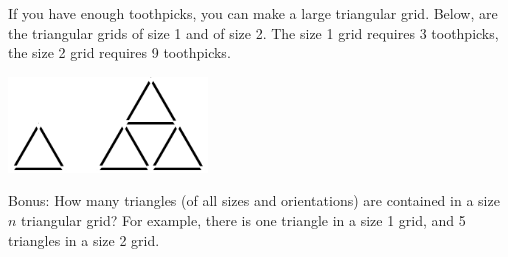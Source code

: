 \documentclass[11pt]{exam}
\begin{document}
\begin{questions}

\question[6] If you have enough toothpicks, you can make a large triangular grid.  Below, are the triangular grids of size 1 and of size 2.  The size 1 grid requires 3 toothpicks, the size 2 grid requires 9 toothpicks.

\centerline{\includegraphics[height=1in]{triangles.png}}
 

\bonusquestion[4] Bonus: How many triangles (of all sizes and orientations) are contained in a size $n$ triangular grid?  For example, there is one triangle in a size 1 grid, and 5 triangles in a size 2 grid.

\end{questions}
\end{document}

